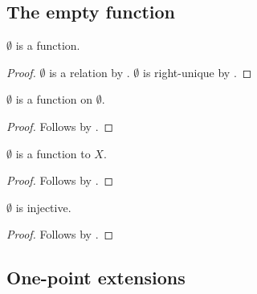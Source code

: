 \subsection{The empty function}

\begin{proposition}\label{emptyset_is_function}
    $\emptyset$ is a function.
\end{proposition}
\begin{proof}
    $\emptyset$ is a relation by .
    $\emptyset$ is right-unique by .
\end{proof}

\begin{proposition}\label{emptyset_is_function_on_emptyset}
    $\emptyset$ is a function on $\emptyset$.
\end{proposition}
\begin{proof}
    Follows by .
\end{proof}

\begin{proposition}\label{codom_of_emptyset_can_be_anything}
    $\emptyset$ is a function to $X$.
\end{proposition}
\begin{proof}
    Follows by .
\end{proof}

\begin{proposition}\label{emptyset_is_injective}
    $\emptyset$ is injective.
\end{proposition}
\begin{proof}
    Follows by .
\end{proof}

\subsection{One-point extensions}

